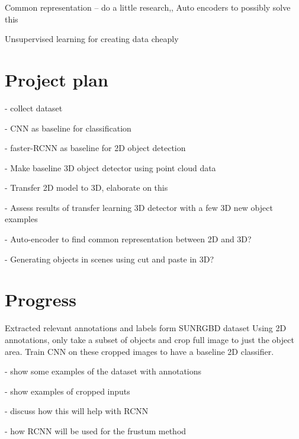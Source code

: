 \documentclass[11pt]{article}
\begin{document}
Common representation -- do a little research,,
	Auto encoders to possibly solve this 

Unsupervised learning for creating data cheaply


\section{Project plan}

- collect dataset

- CNN as baseline for classification

- faster-RCNN as baseline for 2D object detection

- Make baseline 3D object detector using point cloud data

- Transfer 2D model to 3D, elaborate on this

- Assess results of transfer learning 3D detector with a few 3D new object examples

- Auto-encoder to find common representation between 2D and 3D?

- Generating objects in scenes using cut and paste in 3D?

\section{Progress}

Extracted relevant annotations and labels form SUNRGBD dataset
Using 2D annotations, only take a subset of objects and crop full image to just the object area.
Train CNN on these cropped images to have a baseline 2D classifier.

- show some examples of the dataset with annotations

- show examples of cropped inputs

- discuss how this will help with RCNN

- how RCNN will be used for the frustum method





\end{document}
